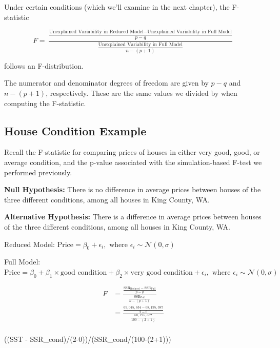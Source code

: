 \documentclass[
  letterpaper,
  DIV=11,
  numbers=noendperiod]{scrreprt}
\newenvironment{Shaded}{\begin{snugshade}}{\end{snugshade}}
\newcommand{\DecValTok}[1]{\textcolor[rgb]{0.68,0.00,0.00}{#1}}
\newcommand{\NormalTok}[1]{\textcolor[rgb]{0.00,0.23,0.31}{#1}}
\newcommand{\SpecialCharTok}[1]{\textcolor[rgb]{0.37,0.37,0.37}{#1}}
\begin{document}
Under certain conditions (which we'll examine in the next chapter), the
F-statistic

\[
F=\frac{\frac{\text{Unexplained Variability in Reduced Model}-\text{Unexplained Variability in Full Model}}{p-q}}{\frac{\text{Unexplained Variability in Full Model}}{n-(p+1)}}
\]

follows an F-distribution.

The numerator and denominator degrees of freedom are given by \(p-q\)
and \(n-(p+1)\), respectively. These are the same values we divided by
when computing the F-statistic.

\subsection{House Condition Example}\label{house-condition-example}

Recall the F-statistic for comparing prices of houses in either very
good, good, or average condition, and the p-value associated with the
simulation-based F-test we performed previously.

\textbf{Null Hypothesis:} There is no difference in average prices
between houses of the three different conditions, among all houses in
King County, WA.

\textbf{Alternative Hypothesis:} There is a difference in average prices
between houses of the three different conditions, among all houses in
King County, WA.

Reduced Model:
\(\text{Price}= \beta_0 + \epsilon_i , \text{ where } \epsilon_i\sim\mathcal{N}(0, \sigma)\)

Full Model:
\(\text{Price}= \beta_0+ \beta_1 \times\text{good condition}+ \beta_2\times\text{very good condition} + \epsilon_i , \text{ where } \epsilon_i\sim\mathcal{N}(0, \sigma)\)

\[
\begin{aligned}
F &= \frac{\frac{\text{SSR}_{\text{Reduced}}-\text{SSR}_{\text{Full}}}{p-q}}{\frac{\text{SSR}_{\text{Full}}}{n-(p+1)}} \\
&=\frac{\frac{69,045,634-68,195,387}{2-0}}{\frac{68,195,387}{100-(2+1)}} \\
\end{aligned}
\]

\begin{Shaded}
\begin{Highlighting}[]
\NormalTok{((SST }\SpecialCharTok{{-}}\NormalTok{ SSR\_cond)}\SpecialCharTok{/}\NormalTok{(}\DecValTok{2{-}0}\NormalTok{))}\SpecialCharTok{/}\NormalTok{(SSR\_cond}\SpecialCharTok{/}\NormalTok{(}\DecValTok{100}\SpecialCharTok{{-}}\NormalTok{(}\DecValTok{2}\SpecialCharTok{+}\DecValTok{1}\NormalTok{)))}
\end{Highlighting}
\end{Shaded}
\end{document}
